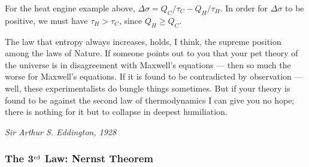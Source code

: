 For the heat engine example above, $\Delta \sigma = Q_C/\tau_C - Q_H/\tau_H$.
In order for $\Delta \sigma$ to be positive, we must have $\tau_H > \tau_C$,
since $Q_H \ge Q_C$.



\epigraph{The law that entropy always increases, holds, I think, the supreme position among the laws of Nature. If someone points out to you that your pet theory of the universe is in disagreement with Maxwell's equations --- then so much the worse for Maxwell's equations. If it is found to be contradicted by observation --- well, these experimentalists do bungle things sometimes. But if your theory is found to be against the second law of thermodynamics I can give you no hope; there is nothing for it but to collapse in deepest humiliation.}
{\textit{Sir Arthur S. Eddington, 1928}}

\subsubsection{The 3$^{\rm rd}$ Law: Nernst Theorem}



